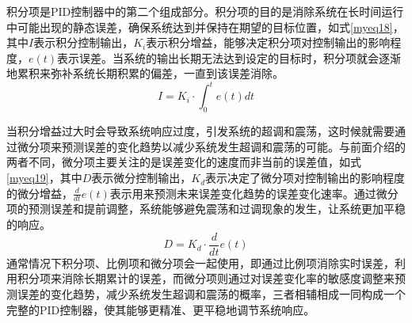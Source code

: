 积分项是PID控制器中的第二个组成部分。积分项的目的是消除系统在长时间运行中可能出现的静态误差，确保系统达到并保持在期望的目标位置，如式\ref{myeq18}，其中$I$表示积分控制输出，${K_i}$表示积分增益，能够决定积分项对控制输出的影响程度，${e\left( t \right)}$表示误差。当系统的输出长期无法达到设定的目标时，积分项就会逐渐地累积来弥补系统长期积累的偏差，一直到该误差消除。
\begin{equation}
    I = {K_i} \cdot \int_0^t {e\left( t \right)dt} 
    \label{myeq18}
\end{equation}

当积分增益过大时会导致系统响应过度，引发系统的超调和震荡，这时候就需要通过微分项来预测误差的变化趋势以减少系统发生超调和震荡的可能。与前面介绍的两者不同，微分项主要关注的是误差变化的速度而非当前的误差值，如式\ref{myeq19}，其中$D$表示微分控制输出，${K_d}$表示决定了微分项对控制输出的影响程度的微分增益，$\frac{d}{{dt}}e\left( t \right)$表示用来预测未来误差变化趋势的误差变化速率。通过微分项的预测误差和提前调整，系统能够避免震荡和过调现象的发生，让系统更加平稳的响应。
\begin{equation}
    D = {K_d} \cdot \frac{d}{{dt}}e\left( t \right)
    \label{myeq19}
\end{equation}
通常情况下积分项、比例项和微分项会一起使用，即通过比例项消除实时误差，利用积分项来消除长期累计的误差，而微分项则通过对误差变化率的敏感度调整来预测误差的变化趋势，减少系统发生超调和震荡的概率，三者相辅相成一同构成一个完整的PID控制器，使其能够更精准、更平稳地调节系统响应。

